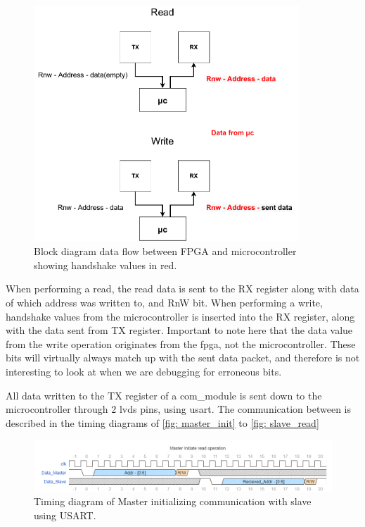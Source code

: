\documentclass[main.tex]{subfiles}
\begin{document}
\begin{figure}[!htpb]
    \centering
    \includegraphics[width=10cm, scale=1]{images/handshake procedure.pdf}
    \caption{Block diagram data flow between FPGA and microcontroller showing handshake values in red.}
    \label{fig: handshake_vals}
\end{figure}
\FloatBarrier

When performing a read, the read data is sent to the RX register along with data of which address was written to, and RnW bit. When performing a write, handshake values from the microcontroller is inserted into the RX register, along with the data sent from TX register. Important to note here that the data value from the write operation originates from the \gls{fpga}, not the microcontroller. These bits will virtually always match up with the sent data packet, and therefore is not interesting to look at when we are debugging for erroneous bits.


All data written to the TX register of a com\_module is sent down to the microcontroller through 2 \gls{lvds} pins, using \acrshort{usart}. The communication between is described in the timing diagrams of \autoref{fig: master_init} to \autoref{fig: slave_read}

\begin{figure}[!htpb]
    \centering
    \includegraphics[width=18cm, scale=1]{images/MasterInitRead.png}
    \caption{Timing diagram of Master initializing communication with slave using USART.}
    \label{fig: master_init}
\end{figure}
\FloatBarrier
\end{document}
